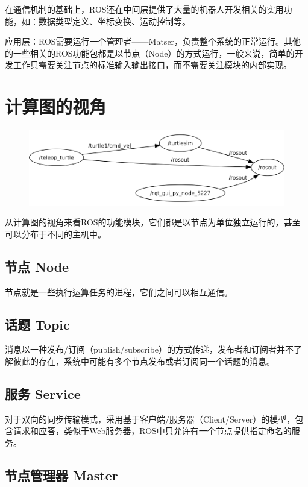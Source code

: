 \documentclass[10pt, oneside]{book}
\begin{document}
在通信机制的基础上，ROS还在中间层提供了大量的机器人开发相关的实用功能，如：数据类型定义、坐标变换、运动控制等。

应用层：ROS需要运行一个管理者——Matser，负责整个系统的正常运行。其他的一些相关的ROS功能包都是以节点（Node）的方式运行，一般来说，简单的开发工作只需要关注节点的标准输入输出接口，而不需要关注模块的内部实现。

\section{计算图的视角}

\begin{figure}[H]
    \centering
    \includegraphics[width=0.7\linewidth]{image/计算图.png}
\end{figure}

从计算图的视角来看ROS的功能模块，它们都是以节点为单位独立运行的，甚至可以分布于不同的主机中。

\subsection{节点 Node}

节点就是一些执行运算任务的进程，它们之间可以相互通信。

\subsection{话题 Topic}

消息以一种发布/订阅（publish/subscribe）的方式传递，发布者和订阅者并不了解彼此的存在，系统中可能有多个节点发布或者订阅同一个话题的消息。

\subsection{服务 Service}

对于双向的同步传输模式，采用基于客户端/服务器（Client/Server）的模型，包含请求和应答，类似于Web服务器，ROS中只允许有一个节点提供指定命名的服务。

\subsection{节点管理器 Master}
\end{document}
